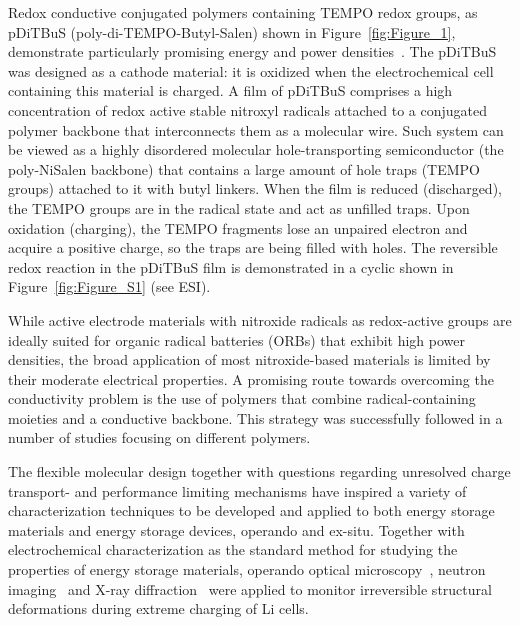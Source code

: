 Redox conductive conjugated polymers containing TEMPO redox groups, as pDiTBuS (poly-di-TEMPO-Butyl-Salen) shown in Figure~\ref{fig:Figure_1}, demonstrate particularly promising energy and power densities~\cite{Vereshchagin2020}. The pDiTBuS was designed as a cathode material: it is oxidized when the electrochemical cell containing this material is charged. A film of pDiTBuS comprises a high concentration of redox active stable nitroxyl radicals attached to a conjugated polymer backbone that interconnects them as a molecular wire. Such system can be viewed as a highly disordered molecular hole-transporting semiconductor (the poly-NiSalen backbone) that contains a large amount of hole traps (TEMPO groups) attached to it with butyl linkers. When the film is reduced (discharged), the TEMPO groups are in the radical state and act as unfilled traps. Upon oxidation (charging), the TEMPO fragments lose an unpaired electron and acquire a positive charge, so the traps are being filled with holes. The reversible redox reaction in the pDiTBuS film is demonstrated in a cyclic  shown in Figure~\ref{fig:Figure_S1} (see ESI).

\par
While active electrode materials with nitroxide radicals as redox-active groups are ideally suited for organic radical batteries (ORBs) that exhibit high power densities, the broad application of most nitroxide-based materials is limited by their moderate electrical properties. A promising route towards overcoming the conductivity problem is the use of polymers that combine radical-containing moieties and a conductive backbone. This strategy was successfully followed in a number of studies focusing on different polymers.\cite{oyaizu2015_polymerjournal, bahaceci2013_jpowersources, katsumata2006_mrc, xu2014_electact, aydin2015_jsoistatelect, schwartz2018_synthmet}

\par

The flexible molecular design together with questions regarding unresolved charge transport- and performance limiting mechanisms have inspired a variety of characterization techniques to be developed and applied to both energy storage materials and energy storage devices, operando and ex-situ. Together with electrochemical characterization as the standard method for studying the properties of energy storage materials\cite{IWASA2007,Zens2022}, operando optical microscopy~\cite{Merryweather2022}, neutron imaging~\cite{Ma2020} and X-ray diffraction~\cite{Rhodes2012} were applied to monitor irreversible structural deformations during extreme charging of Li cells.

